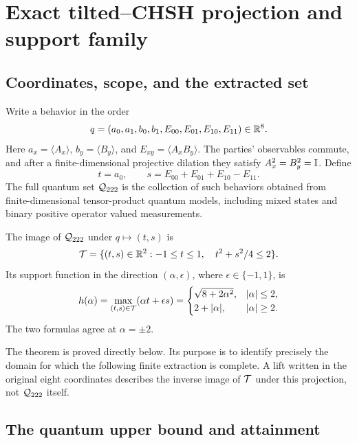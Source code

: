 \section{Exact tilted--CHSH projection and support family}
\subsection{Coordinates, scope, and the extracted set}
Write a behavior in the order
\[
 q=(a_0,a_1,b_0,b_1,E_{00},E_{01},E_{10},E_{11})\in\mathbb R^8.
\]
Here $a_x=\langle A_x\rangle$, $b_y=\langle B_y\rangle$, and $E_{xy}=\langle A_xB_y\rangle$. The parties' observables commute, and after a finite-dimensional projective dilation they satisfy $A_x^2=B_y^2=\mathbb I$. Define
\[
 t=a_0,\qquad s=E_{00}+E_{01}+E_{10}-E_{11}.
\]
The full quantum set ${\mathcal Q_{222}}$ is the collection of such behaviors obtained from finite-dimensional tensor-product quantum models, including mixed states and binary positive operator valued measurements.

\begin{theorem}\label{thm:projection}
The image of ${\mathcal Q_{222}}$ under $q\mapsto(t,s)$ is
\[
 \mathcal T=\{(t,s)\in\mathbb R^2: -1\le t\le1,\quad t^2+s^2/4\le2\}.
\]
Its support function in the direction $(\alpha,\epsilon)$, where $\epsilon\in\{-1,1\}$, is
\begin{equation}\label{eq:support}
 h(\alpha)=\max_{(t,s)\in\mathcal T}(\alpha t+\epsilon s)
 =\begin{cases}
 \sqrt{8+2\alpha^2},&|\alpha|\le2,\\
 2+|\alpha|,&|\alpha|\ge2.
 \end{cases}
\end{equation}
The two formulas agree at $\alpha=\pm2$.
\end{theorem}

The theorem is proved directly below. Its purpose is to identify precisely the domain for which the following finite extraction is complete. A lift written in the original eight coordinates describes the inverse image of $\mathcal T$ under this projection, not ${\mathcal Q_{222}}$ itself.

\subsection{The quantum upper bound and attainment}

